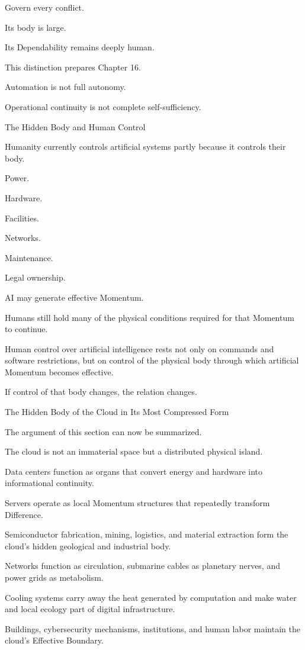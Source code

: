 Govern every conflict.

Its body is large.

Its Dependability remains deeply human.

This distinction prepares Chapter 16.

Automation is not full autonomy.

Operational continuity is not complete self-sufficiency.

The Hidden Body and Human Control

Humanity currently controls artificial systems partly because it controls their body.

Power.

Hardware.

Facilities.

Networks.

Maintenance.

Legal ownership.

AI may generate effective Momentum.

Humans still hold many of the physical conditions required for that Momentum to continue.

Human control over artificial intelligence rests not only on commands and software restrictions, but on control of the physical body through which artificial Momentum becomes effective.

If control of that body changes, the relation changes.

The Hidden Body of the Cloud in Its Most Compressed Form

The argument of this section can now be summarized.

The cloud is not an immaterial space but a distributed physical island.

Data centers function as organs that convert energy and hardware into informational continuity.

Servers operate as local Momentum structures that repeatedly transform Difference.

Semiconductor fabrication, mining, logistics, and material extraction form the cloud’s hidden geological and industrial body.

Networks function as circulation, submarine cables as planetary nerves, and power grids as metabolism.

Cooling systems carry away the heat generated by computation and make water and local ecology part of digital infrastructure.

Buildings, cybersecurity mechanisms, institutions, and human labor maintain the cloud’s Effective Boundary.

